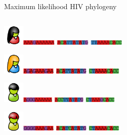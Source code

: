 \documentclass{beamer}
\begin{document}
\begin{frame}{Maximum likelihood HIV phylogeny}
    \begin{columns}
        \begin{column}{0.5\textwidth}
            \includegraphics[height=1cm]{person7}\includegraphics[height=0.25cm]{sequence1}

            \includegraphics[height=1cm]{person8}\includegraphics[height=0.25cm]{sequence2}

            \includegraphics[height=1cm]{person9}\includegraphics[height=0.25cm]{sequence4}

            \includegraphics[height=1cm]{person10}\includegraphics[height=0.25cm]{sequence5}
        \end{column}
        \begin{column}{0.5\textwidth}
            \centering
\end{column}
\end{columns}
\end{frame}
\end{document}
